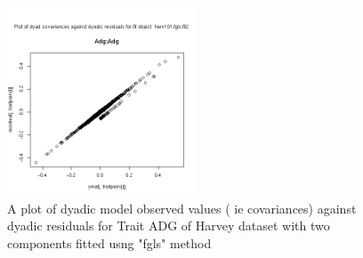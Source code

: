 %

\begin{figure}[h]
  \centering
  \includegraphics[width=0.5\textwidth]{harv101fig4.png}
  \caption{A plot of dyadic model observed values ( ie covariances)  against dyadic residuals
     for Trait  ADG of Harvey dataset with two components fitted usng "fgls" method}
  \label{fig:4}
\end{figure}

%


